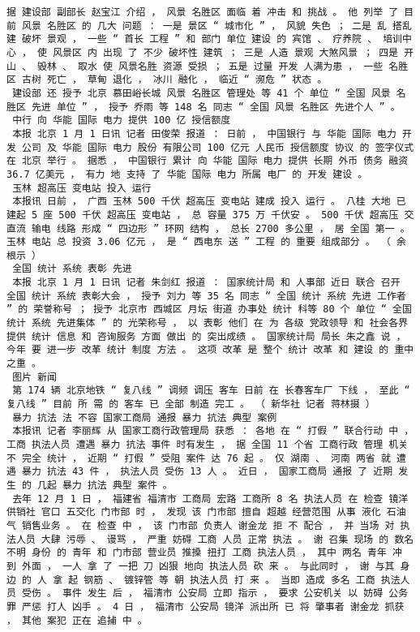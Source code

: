 \documentclass{article}
\begin{document}
\begin{Verbatim}[commandchars=\\\{\}]
 据 建设部 副部长 赵宝江 介绍 ， 风景 名胜区 面临 着 冲击 和 挑战 。 他 列举 了 目前 风景 名胜区 的 几大 问题 ： 一是 景区 “ 城市化 ” ， 风貌 失色 ； 二是 乱 搭乱建 破坏 景观 ， 一些 “ 首长 工程 ” 和 部门 单位 建设 的 宾馆 、 疗养院 、 培训中心 ， 使 风景区 内 出现 了 不少 破坏性 建筑 ； 三是 人造 景观 大煞风景 ； 四是 开山 、 毁林 、 取水 使 风景名胜 资源 受损 ； 五是 过量 开发 人满为患 ， 一些 名胜区 古树 死亡 ， 草甸 退化 ， 冰川 融化 ， 临近 “ 濒危 ” 状态 。 
 建设部 还 授予 北京 慕田峪长城 风景 名胜区 管理处 等 41 个 单位 “ 全国 风景 名胜区 先进 单位 ” ， 授予 乔雨 等 148 名 同志 “ 全国 风景 名胜区 先进个人 ” 。 
 中行 向 华能 国际 电力 提供 100 亿 授信额度 
 本报 北京 1 月 1 日讯 记者 田俊荣 报道 ： 日前 ， 中国银行 与 华能 国际 电力 开发 公司 及 华能 国际 电力 股份 有限公司 100 亿元 人民币 授信额度 协议 的 签字仪式 在 北京 举行 。 据悉 ， 中国银行 累计 向 华能 国际 电力 提供 长期 外币 债务 融资 36.7 亿美元 ， 有力 地 支持 了 华能 国际 电力 所属 电厂 的 开发 建设 。 
 玉林 超高压 变电站 投入 运行 
 本报讯 日前 ， 广西 玉林 500 千伏 超高压 变电站 建成 投入 运行 。 八桂 大地 已 建起 5 座 500 千伏 超高压 变电站 ， 总 容量 375 万 千伏安 。 500 千伏 超高压 交直流 输电 线路 形成 “ 四边形 ” 环网 结构 ， 总长 2700 多公里 ， 居 全国 第一 。 玉林 电站 总 投资 3.06 亿元 ， 是 “ 西电东 送 ” 工程 的 重要 组成部分 。 （ 余根示 ） 
 全国 统计 系统 表彰 先进 
 本报 北京 1 月 1 日讯 记者 朱剑红 报道 ： 国家统计局 和 人事部 近日 联合 召开 全国 统计 系统 表彰大会 ， 授予 刘力 等 35 名 同志 “ 全国 统计 系统 先进 工作者 ” 的 荣誉称号 ； 授予 北京市 西城区 月坛 街道 办事处 统计 科等 80 个 单位 “ 全国 统计 系统 先进集体 ” 的 光荣称号 ， 以 表彰 他们 在 为 各级 党政领导 和 社会各界 提供 统计 信息 和 咨询服务 方面 做出 的 突出成绩 。 国家统计局 局长 朱之鑫 说 ， 今年 要 进一步 改革 统计 制度 方法 。 这项 改革 是 整个 统计 改革 和 建设 的 重中之重 。 
 图片 新闻 
 第 174 辆 北京地铁 “ 复八线 ” 调频 调压 客车 日前 在 长春客车厂 下线 ， 至此 “ 复八线 ” 目前 所 需 的 客车 已 全部 制造 完工 。 （ 新华社 记者 蒋林摄 ） 
 暴力 抗法 法 不容 国家工商局 通报 暴力 抗法 典型 案例 
 本报讯 记者 李丽辉 从 国家工商行政管理局 获悉 ： 各地 在 “ 打假 ” 联合行动 中 ， 工商 执法人员 遭遇 暴力 抗法 事件 时有发生 ， 据 全国 11 个省 工商行政 管理 机关 不 完全 统计 ， 近期 “ 打假 ” 受阻 案件 达 76 起 。 仅 湖南 、 河南 两省 就 遭遇 暴力 抗法 43 件 ， 执法人员 受伤 13 人 。 近日 ， 国家工商局 通报 了 近期 发生 的 几起 暴力 抗法 典型 案件 。 
 去年 12 月 1 日 ， 福建省 福清市 工商局 宏路 工商所 8 名 执法人员 在 检查 镜洋 供销社 官口 五交化 门市部 时 ， 发现 该 门市部 擅自 超越 经营范围 从事 液化 石油气 销售业务 。 在 检查 中 ， 该 门市部 负责人 谢金龙 拒 不 配合 ， 并 当场 对 执法人员 大肆 污辱 、 谩骂 ， 严重 妨碍 工商 人员 正常 执法 。 谢 召集 现场 的 数名 不明 身份 的 青年 和 门市部 营业员 推搡 扭打 工商 执法人员 ， 其中 两名 青年 冲 到 外面 ， 一人 拿 了 一把 刀 凶狠 地向 执法人员 砍 来 。 与此同时 ， 谢 与其 身边 的 人 拿 起 钢筋 、 镀锌管 等 朝 执法人员 打 来 。 当即 造成 多名 工商 执法人员 受伤 。 事件 发生 后 ， 福清市 公安局 立即 指示 ， 要求 公安机关 以 妨碍 公务 罪 严惩 打人 凶手 。 4 日 ， 福清市 公安局 镜洋 派出所 已 将 肇事者 谢金龙 抓获 ， 其他 案犯 正在 追捕 中 。 

\end{Verbatim}
\end{document}
